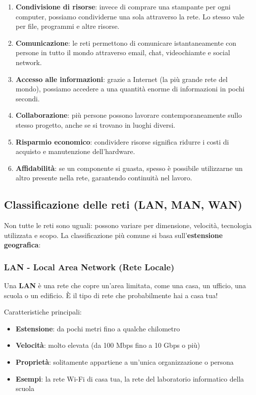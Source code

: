 \documentclass[12pt,a4paper]{article}
\begin{document}
\begin{enumerate}
    \item \textbf{Condivisione di risorse}: invece di comprare una stampante per ogni computer, possiamo condividerne una sola attraverso la rete. Lo stesso vale per file, programmi e altre risorse.
    
    \item \textbf{Comunicazione}: le reti permettono di comunicare istantaneamente con persone in tutto il mondo attraverso email, chat, videochiamte e social network.
    
    \item \textbf{Accesso alle informazioni}: grazie a Internet (la più grande rete del mondo), possiamo accedere a una quantità enorme di informazioni in pochi secondi.
    
    \item \textbf{Collaborazione}: più persone possono lavorare contemporaneamente sullo stesso progetto, anche se si trovano in luoghi diversi.
    
    \item \textbf{Risparmio economico}: condividere risorse significa ridurre i costi di acquisto e manutenzione dell'hardware.
    
    \item \textbf{Affidabilità}: se un componente si guasta, spesso è possibile utilizzarne un altro presente nella rete, garantendo continuità nel lavoro.
\end{enumerate}

\subsection{Classificazione delle reti (LAN, MAN, WAN)}

Non tutte le reti sono uguali: possono variare per dimensione, velocità, tecnologia utilizzata e scopo. La classificazione più comune si basa sull'\textbf{estensione geografica}:

\subsubsection*{LAN - Local Area Network (Rete Locale)}

Una \textbf{LAN} è una rete che copre un'area limitata, come una casa, un ufficio, una scuola o un edificio. È il tipo di rete che probabilmente hai a casa tua!

Caratteristiche principali:
\begin{itemize}
    \item \textbf{Estensione}: da pochi metri fino a qualche chilometro
    \item \textbf{Velocità}: molto elevata (da 100 Mbps fino a 10 Gbps o più)
    \item \textbf{Proprietà}: solitamente appartiene a un'unica organizzazione o persona
    \item \textbf{Esempi}: la rete Wi-Fi di casa tua, la rete del laboratorio informatico della scuola
\end{itemize}
\end{document}
